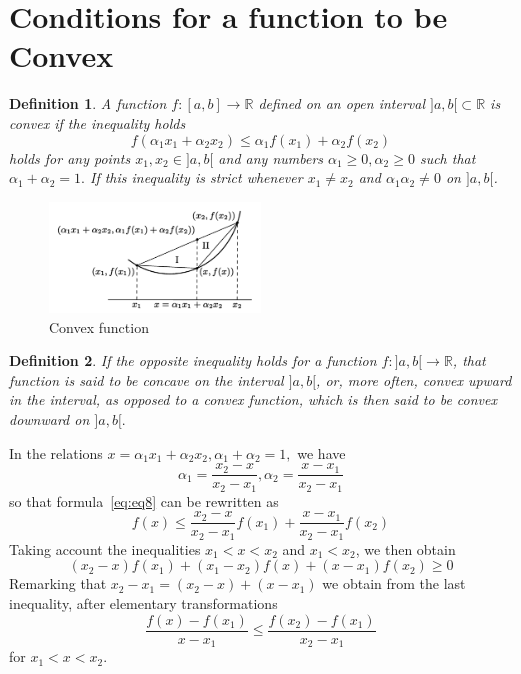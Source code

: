 \documentclass[a4paper,12pt]{article} %
\newtheorem{definition}{Definition}[section]
\begin{document}
\section{Conditions for a function to be Convex}
\begin{definition}
    \normalfont 
    A function $f: [a,b] \to \mathbb{R}$ defined on an open interval $]a,b[\subset \mathbb{R}$
    is convex if the inequality holds
    \begin{equation}
        f(\alpha_1x_1 + \alpha_2x_2) \le \alpha_1f(x_1) + \alpha_2f(x_2)
        \label{eq:eq8}
    \end{equation}
    holds for any points $x_1, x_2 \in ]a,b[$ and any numbers $\alpha_1\ge 0, \alpha_2 \ge 0$ 
    such that $\alpha_1 + \alpha_2 = 1.$ If this inequality is strict whenever $x_1 \ne x_2$
    and $\alpha_1\alpha_2 \ne 0$ on $]a,b[$.
\end{definition}

\graphicspath{ 
    {./Figs/}
}
\begin{figure}[htbp]
    \centering
    \includegraphics[width=0.5\textwidth]{convex.png}
    \caption{Convex function}
    \label{fig:fig2}
\end{figure}

\begin{definition}
    \normalfont 
    If the opposite inequality holds for a function $f: ]a,b[ \to \mathbb{R}$,
    that function is said to be concave on the interval $]a,b[$, or, more often,
    convex upward in the interval, as opposed to a convex function, which is 
    then said to be convex downward on $]a,b[.$
\end{definition}

In the relations $x = \alpha_1 x_1 + \alpha_2 x_2, \alpha_1 + \alpha_2 = 1,$ we have 
\[
    \alpha_1 = \frac{x_2 - x}{x_2 - x_1}, \alpha_2 = \frac{x - x_1}{x_2 - x_1}
    \]
so that formula~\ref{eq:eq8} can be rewritten as 
\[
    f(x) \le \frac{x_2 - x}{x_2 - x_1}f(x_1) + \frac{x - x_1}{x_2 - x_1}f(x_2)
    \]
Taking account the inequalities $x_1 < x < x_2$ and $x_1 < x_2$, we then 
obtain 
\[
    \left(x_2 - x\right)f(x_1) + \left(x_1 - x_2\right)f(x) + \left(x - x_1\right)f(x_2) \ge 0
    \]
Remarking that $x_2 - x_1 = (x_2 - x) + (x - x_1)$ we obtain from the last 
inequality, after elementary transformations 
\begin{equation}
    \frac{f(x) - f(x_1)}{x - x_1} \le \frac{f(x_2) - f(x_1)}{x_2 - x_1}
    \label{eq:eq9}
\end{equation}
for $x_1 < x < x_2$.
\end{document}
